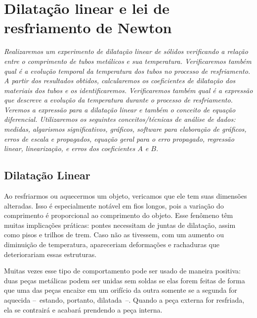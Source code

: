 \chapter{Dilatação linear e lei de resfriamento de Newton}
\label{Chap:ExpDilatacaoLinear}

\begin{fullwidth}\it
	Realizaremos um experimento de dilatação linear de sólidos verificando a relação entre o comprimento de tubos metálicos e sua temperatura. Verificaremos também qual é a evolução temporal da temperatura dos tubos no processo de resfriamento. A partir dos resultados obtidos, calcularemos os coeficientes de dilatação dos materiais dos tubos e os identificaremos. Verificaremos também qual é a expressão que descreve a evolução da temperatura durante o processo de resfriamento. Veremos a expressão para a dilatação linear e também o conceito de equação diferencial. Utilizaremos os seguintes conceitos/técnicas de análise de dados: medidas, algarismos significativos, gráficos, software para elaboração de gráficos, erros de escala e propagados, equação geral para o erro propagado, regressão linear, linearização, e erros dos coeficientes $A$ e $B$.
\end{fullwidth}

\section{Dilatação Linear}

Ao resfriarmos ou aquecermos um objeto, vericamos que ele tem suas dimensões alteradas. Isso é especialmente notável em fios longos, pois a variação do comprimento é proporcional ao comprimento do objeto. Esse fenômeno têm muitas implicações práticas: pontes necessitam de juntas de dilatação, assim como pisos e trilhos de trem. Caso não as tivessem, com um aumento ou diminuição de temperatura, apareceriam deformações e rachaduras que deteriorariam essas estruturas. 

Muitas vezes esse tipo de comportamento pode ser usado de maneira positiva: duas peças metálicas podem ser unidas sem soldas se elas forem feitas de forma que uma das peças encaixe em um orifício da outra somente se a segunda for aquecida --~estando, portanto, dilatada~--. Quando a peça externa for resfriada, ela se contrairá e acabará prendendo a peça interna.

